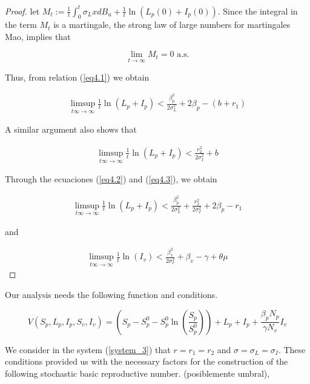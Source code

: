 \begin{proof}
	let $M_t :=\frac{1}{t}\int_{0}^{t}\sigma_L xdB_u+\frac{1}{t}\ln(L_p(0)+I_p(0))$. Since the integral in the term $M_t$ is a martingale, the strong law of large numbers for martingales Mao, implies that 
	
	\begin{equation*}
		\lim\limits_{t \rightarrow \infty}M_t = 0\,\,\mbox{a.s.}
	\end{equation*}
	
	Thus, from relation (\ref{eq4.1}) we obtain
	
	\begin{align}\label{eq4.2}
		\limsup_{t\infty \rightarrow \infty}\frac{1}{t}\ln(L_p+I_p)<\frac{\beta_p^2}{2\sigma_L^2}+	2\beta_p-(b+r_1)
	\end{align}
	
	A similar argument also shows that
	
	\begin{align}\label{eq4.3}
		\limsup_{t\infty \rightarrow \infty}\frac{1}{t}\ln(L_p+I_p)<\frac{r_2^2}{2\sigma_I^2}+b
	\end{align}
	
	Through the ecuaciones (\ref{eq4.2}) and (\ref{eq4.3}), we obtain
	
	\begin{align*}
		\limsup_{t\infty \rightarrow \infty}\frac{1}{t}\ln(L_p+I_p)<\frac{\beta_p^2}{2\sigma_L^2}+\frac{r_2^2}{2\sigma_I^2}+	2\beta_p-r_1
	\end{align*}
	
	and 
	
	\begin{align*}
		\limsup_{t\infty \rightarrow \infty}\frac{1}{t}\ln(I_v)<\frac{\beta_v^2}{2\sigma_v^2}+\beta_v-\gamma+\theta\mu
	\end{align*}
\end{proof}



Our analysis needs the following function and conditions.

\begin{equation}\label{eq4}
V(S_p,L_p,I_p,S_v,I_v) = \left(S_p-S_p^0-S_p^0\ln\left(\frac{S_p}{S_p^0}\right)\right)+L_p+I_p+\frac{\beta_p N_p}{\gamma N_v}I_v
\end{equation}

We consider in the system (\ref{system_3}) that $r=r_1=r_2$ and $\sigma=\sigma_L=\sigma_I$. These conditions provided us with the necessary factors for the construction of the following stochastic basic reproductive number. (posiblemente umbral), 

